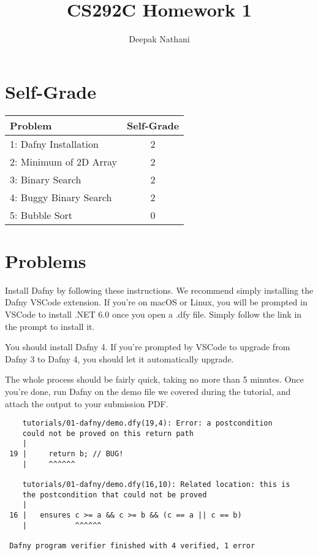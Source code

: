 \documentclass{jhwhw}
\author{Deepak Nathani}
\title{CS292C Homework 1}
\begin{document}
\maketitle

\section{Self-Grade}

\begin{table}[h]
    \centering
    \begin{tabular}{l|c}
        \toprule
        \midrule
        \textbf{Problem} & \textbf{Self-Grade} \\
        \midrule
        {1: Dafny Installation} & {2} \\
        \midrule
        {2: Minimum of 2D Array} & {2} \\
        \midrule
        {3: Binary Search} & {2} \\
        \midrule
        {4: Buggy Binary Search} & {2} \\
        \midrule
        {5: Bubble Sort} & {0} \\
        \midrule
        \bottomrule
    \end{tabular}
\end{table}

\section{Problems}
Install Dafny by following these instructions. We recommend simply installing the Dafny VSCode extension. If you're on macOS or Linux, you will be prompted in VSCode to install .NET 6.0 once you open a .dfy file. Simply follow the link in the prompt to install it.


You should install Dafny 4. If you're prompted by VSCode to upgrade from Dafny 3 to Dafny 4, you should let it automatically upgrade.


The whole process should be fairly quick, taking no more than 5 minutes.
Once you're done, run Dafny on the demo file we covered during the tutorial, and attach the output to your submission PDF.

\solution

\begin{lstlisting}
    tutorials/01-dafny/demo.dfy(19,4): Error: a postcondition 
    could not be proved on this return path
    |
 19 |     return b; // BUG!
    |     ^^^^^^
 
    tutorials/01-dafny/demo.dfy(16,10): Related location: this is
    the postcondition that could not be proved
    |
 16 |   ensures c >= a && c >= b && (c == a || c == b)
    |           ^^^^^^
 
 Dafny program verifier finished with 4 verified, 1 error
\end{lstlisting}
\end{document}
